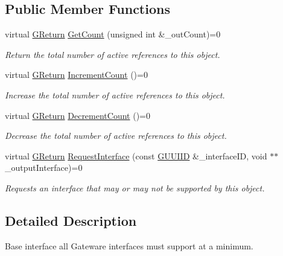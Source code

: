 \subsection*{Public Member Functions}
\begin{DoxyCompactItemize}
\item 
virtual \mbox{\hyperlink{namespace_g_w_a67a839e3df7ea8a5c5686613a7a3de21}{G\+Return}} \mbox{\hyperlink{class_g_w_1_1_c_o_r_e_1_1_g_interface_aacf5834174a7024f8a3c361122ee9e76}{Get\+Count}} (unsigned int \&\+\_\+out\+Count)=0
\begin{DoxyCompactList}\small\item\em Return the total number of active references to this object. \end{DoxyCompactList}\item 
virtual \mbox{\hyperlink{namespace_g_w_a67a839e3df7ea8a5c5686613a7a3de21}{G\+Return}} \mbox{\hyperlink{class_g_w_1_1_c_o_r_e_1_1_g_interface_a2d710f20bb78e544e8309b5b75c21260}{Increment\+Count}} ()=0
\begin{DoxyCompactList}\small\item\em Increase the total number of active references to this object. \end{DoxyCompactList}\item 
virtual \mbox{\hyperlink{namespace_g_w_a67a839e3df7ea8a5c5686613a7a3de21}{G\+Return}} \mbox{\hyperlink{class_g_w_1_1_c_o_r_e_1_1_g_interface_a19a368c77ad0aa7f49b5a4f772f173ba}{Decrement\+Count}} ()=0
\begin{DoxyCompactList}\small\item\em Decrease the total number of active references to this object. \end{DoxyCompactList}\item 
virtual \mbox{\hyperlink{namespace_g_w_a67a839e3df7ea8a5c5686613a7a3de21}{G\+Return}} \mbox{\hyperlink{class_g_w_1_1_c_o_r_e_1_1_g_interface_ad6c8324970172784964f484686d4fdad}{Request\+Interface}} (const \mbox{\hyperlink{struct_g_w_1_1_g_u_u_i_i_d}{G\+U\+U\+I\+ID}} \&\+\_\+interface\+ID, void $\ast$$\ast$\+\_\+output\+Interface)=0
\begin{DoxyCompactList}\small\item\em Requests an interface that may or may not be supported by this object. \end{DoxyCompactList}\end{DoxyCompactItemize}


\subsection{Detailed Description}
Base interface all Gateware interfaces must support at a minimum. 

